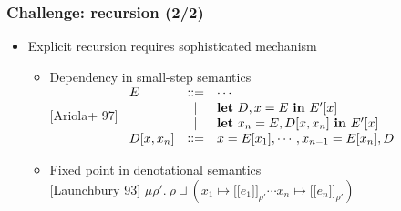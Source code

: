 \documentclass[professionalfont,dvipdfmx,cjk,xcolor=dvipsnames,envcountsect,notheorems,12pt]{beamer}
\theoremstyle{definition}
\newcommand{\xtwoheadrightarrow}[2][]{%
  \xrightarrow[#1]{#2}\mathrel{\mkern-14mu}\rightarrow
}
\newcommand{\keyword}[1]{\mathbf{#1}}
\newcommand{\LET}[2]{\keyword{let}~#1~\keyword{in}~#2}
\newcommand{\CALLBYNEED}{\xrightarrow{\mathrm{need}}}
\newcommand{\RTCLOSCALLBYNEED}{\xtwoheadrightarrow{\mathrm{need}}}
\newcommand{\lBrack}{\ensuremath{[\![}}
\newcommand{\rBrack}{\ensuremath{]\!]}}
\begin{document}
%
\begin{frame}
	\frametitle{Challenge: recursion (2/2)}
	\Large
	\begin{itemize}
		\item Explicit recursion requires sophisticated mechanism
			\begin{itemize}
				\item Dependency in small-step semantics\\
					\vspace{-2mm}
					{\small [Ariola+ 97]}
					{\large $\begin{array}{lcl}
						E & \vcentcolon\vcentcolon = & \cdots \\
						& | & \LET{D,x=E}{E'[x]} \\
						& | & \LET{x_n=E,D[x,x_n]}{E'[x]} \\
						D[x,x_n] & \vcentcolon\vcentcolon = & x=E[x_1],\cdots,x_{n-1}=E[x_n], D
					\end{array}$}
				\item Fixed point in denotational semantics\\
					\vspace{-2mm}
					{\small [Launchbury 93]}
					{\large $\mu \rho'.~\rho \sqcup (x_1 \mapsto \lBrack e_1 \rBrack_{\rho'}\cdots x_n \mapsto \lBrack e_n \rBrack_{\rho'})$}
			\end{itemize}
	\end{itemize}
\end{frame}
\end{document}
